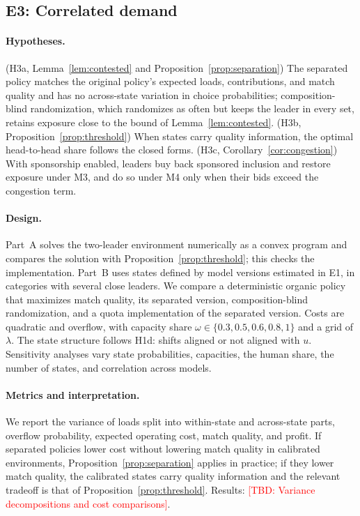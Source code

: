 \documentclass[opre,dblanonrev]{informs4}
\providecommand{\1}{\mathbf{1}}
\providecommand{\TBD}[1]{\textcolor{red}{[TBD: #1]}}
\begin{document}
\subsection{E3: Correlated demand}\label{sec:exp-correlated}

\paragraph{Hypotheses.} (H3a, Lemma~\ref{lem:contested} and Proposition~\ref{prop:separation}) The separated policy matches the original policy's expected loads, contributions, and match quality and has no across-state variation in choice probabilities; composition-blind randomization, which randomizes as often but keeps the leader in every set, retains exposure close to the bound of Lemma~\ref{lem:contested}. (H3b, Proposition~\ref{prop:threshold}) When states carry quality information, the optimal head-to-head share follows the closed forms. (H3c, Corollary~\ref{cor:congestion}) With sponsorship enabled, leaders buy back sponsored inclusion and restore exposure under M3, and do so under M4 only when their bids exceed the congestion term.

\paragraph{Design.} Part~A solves the two-leader environment numerically as a convex program and compares the solution with Proposition~\ref{prop:threshold}; this checks the implementation. Part~B uses states defined by model versions estimated in E1, in categories with several close leaders. We compare a deterministic organic policy that maximizes match quality, its separated version, composition-blind randomization, and a quota implementation of the separated version. Costs are quadratic and overflow, with capacity share $\omega\in\{0.3,0.5,0.6,0.8,1\}$ and a grid of $\lambda$. The state structure follows H1d: shifts aligned or not aligned with $u$. Sensitivity analyses vary state probabilities, capacities, the human share, the number of states, and correlation across models.

\paragraph{Metrics and interpretation.} We report the variance of loads split into within-state and across-state parts, overflow probability, expected operating cost, match quality, and profit. If separated policies lower cost without lowering match quality in calibrated environments, Proposition~\ref{prop:separation} applies in practice; if they lower match quality, the calibrated states carry quality information and the relevant tradeoff is that of Proposition~\ref{prop:threshold}. Results: \TBD{Variance decompositions and cost comparisons}.
\end{document}

